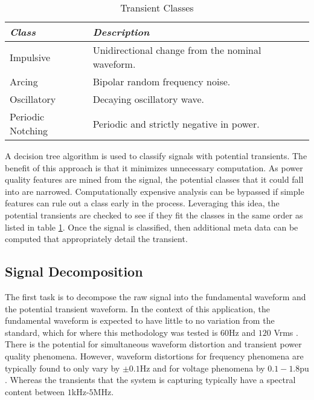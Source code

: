 \documentclass[10pt,conference,compsocconf]{IEEEtran}
\begin{document}
%
\begin{table}[htbp]
\caption{Transient Classes}\label{TransientClasses}
\centering%
\begin{tabular}{lll}
\hline
\textit{Class} & \textit{Description} \\
\hline
Impulsive & Unidirectional change from the nominal waveform. \\
Arcing & Bipolar random frequency noise. \\
Oscillatory & Decaying oscillatory wave. \\
Periodic Notching & Periodic and strictly negative in power. \\
\hline
\end{tabular}
\end{table}
%

A decision tree algorithm is used to classify signals with potential transients. The benefit of this approach is that it minimizes unnecessary computation. As power quality features are mined from the signal, the potential classes that it could fall into are narrowed. Computationally expensive analysis can be bypassed if simple features can rule out a class early in the process. Leveraging this idea, the potential transients are checked to see if they fit the classes in the same order as listed in table \ref{TransientClasses}. Once the signal is classified, then additional meta data can be computed that appropriately detail the transient.

\subsection{Signal Decomposition}

The first task is to decompose the raw signal into the fundamental waveform and the potential transient waveform. In the context of this application, the fundamental waveform is expected to have little to no variation from the standard, which for where this methodology was tested is $60$Hz and $120$ Vrms \cite{ANSI:2016:C84.1-2016}. There is the potential for simultaneous waveform distortion and transient power quality phenomena. However, waveform distortions for frequency phenomena are typically found to only vary by $\pm 0.1$Hz and for voltage phenomena by $0.1-1.8$pu \cite{IEEE:2018:1159D3}. Whereas the transients that the system is capturing typically have a spectral content between $1$kHz-$5$MHz. 
\end{document}
